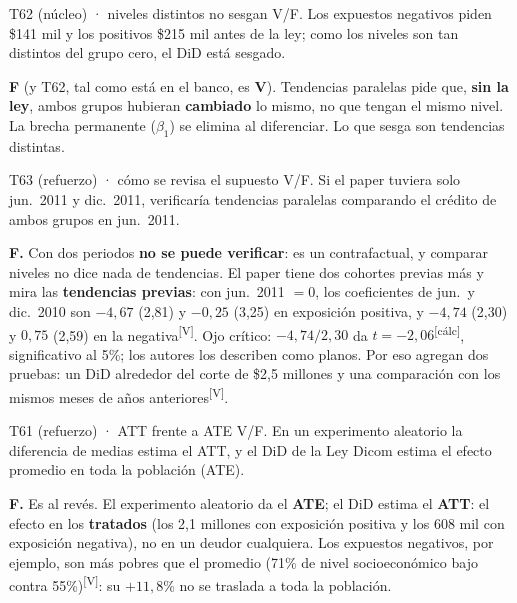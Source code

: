 \documentclass[10pt,a4paper]{article}
\newcommand{\V}{\textsuperscript{\textcolor{green!45!black}{[V]}}}
\newcommand{\calc}{\textsuperscript{\textcolor{blue!60!black}{[cálc]}}}
\begin{document}
\begin{enun}{T62 (núcleo) · niveles distintos no sesgan}
V/F. Los expuestos negativos piden \$141 mil y los positivos \$215 mil antes de la ley; como los niveles son tan distintos del grupo cero, el DiD está sesgado.
\end{enun}
\begin{ejemplar}
\textbf{F} (y T62, tal como está en el banco, es \textbf{V}). Tendencias paralelas pide que, \textbf{sin la ley}, ambos grupos hubieran \textbf{cambiado} lo mismo, no que tengan el mismo nivel. La brecha permanente ($\beta_1$) se elimina al diferenciar. Lo que sesga son tendencias distintas.
\end{ejemplar}

\begin{enun}{T63 (refuerzo) · cómo se revisa el supuesto}
V/F. Si el paper tuviera solo jun.\ 2011 y dic.\ 2011, verificaría tendencias paralelas comparando el crédito de ambos grupos en jun.\ 2011.
\end{enun}
\begin{ejemplar}
\textbf{F.} Con dos periodos \textbf{no se puede verificar}: es un contrafactual, y comparar niveles no dice nada de tendencias. El paper tiene dos cohortes previas más y mira las \textbf{tendencias previas}: con jun.\ 2011 $=0$, los coeficientes de jun.\ y dic.\ 2010 son $-4{,}67$ (2,81) y $-0{,}25$ (3,25) en exposición positiva, y $-4{,}74$ (2,30) y $0{,}75$ (2,59) en la negativa\V. Ojo crítico: $-4{,}74/2{,}30$ da $t=-2{,}06$\calc, significativo al 5\%; los autores los describen como planos. Por eso agregan dos pruebas: un DiD alrededor del corte de \$2,5 millones y una comparación con los mismos meses de años anteriores\V.
\end{ejemplar}

\begin{enun}{T61 (refuerzo) · ATT frente a ATE}
V/F. En un experimento aleatorio la diferencia de medias estima el ATT, y el DiD de la Ley Dicom estima el efecto promedio en toda la población (ATE).
\end{enun}
\begin{ejemplar}
\textbf{F.} Es al revés. El experimento aleatorio da el \textbf{ATE}; el DiD estima el \textbf{ATT}: el efecto en los \textbf{tratados} (los 2,1 millones con exposición positiva y los 608 mil con exposición negativa), no en un deudor cualquiera. Los expuestos negativos, por ejemplo, son más pobres que el promedio (71\% de nivel socioeconómico bajo contra 55\%)\V: su $+11{,}8\%$ no se traslada a toda la población.
\end{ejemplar}
\end{document}
